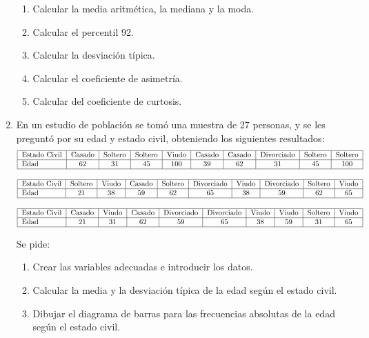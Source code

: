 \begin{enumerate}[leftmargin=*]
\begin{enumerate}
\item  Calcular la media aritmética, la mediana y la moda.
\item  Calcular el percentil 92.
\item  Calcular la desviación típica.
\item  Calcular el coeficiente de asimetría.
\item  Calcular del coeficiente de curtosis.
\end{enumerate}


\item  En un estudio de población se tomó una muestra de
27 personas, y se les preguntó por su edad y estado civil,
obteniendo los siguientes resultados:
\[\begin{tabular}{|l|c|c|c|c|c|c|c|c|c|}
  \hline
  Estado Civil & Casado & Soltero & Soltero & Viudo & Casado
  & Casado & Divorciado & Soltero & Soltero \\
  \hline
  Edad & 62 & 31 & 45 & 100 & 39 & 62 & 31 & 45 & 100
  \\ \hline
\end{tabular}
\]

\[\begin{tabular}{|l|c|c|c|c|c|c|c|c|c|}
  \hline
  Estado Civil & Soltero & Viudo & Casado
  & Soltero & Divorciado & Viudo & Divorciado & Soltero & Viudo \\ \hline
  Edad & 21 & 38 & 59 & 62 & 65 & 38 & 59 & 62 & 65
  \\ \hline
\end{tabular}
\]

\[\begin{tabular}{|l|c|c|c|c|c|c|c|c|c|}
  \hline
  Estado Civil & Casado & Viudo & Casado
  & Divorciado & Divorciado & Viudo & Viudo & Soltero & Viudo \\ \hline
  Edad & 21 & 31 & 62 & 59 & 65 & 38 & 59 & 31 & 65
  \\ \hline
\end{tabular}
\]

Se pide:
\begin{enumerate}
\item Crear las variables adecuadas e introducir los datos.
\item Calcular la media y la desviación típica de la edad según el estado civil.
\item Dibujar el diagrama de barras para las frecuencias absolutas de la edad según el estado civil.
\end{enumerate}




\end{enumerate}
